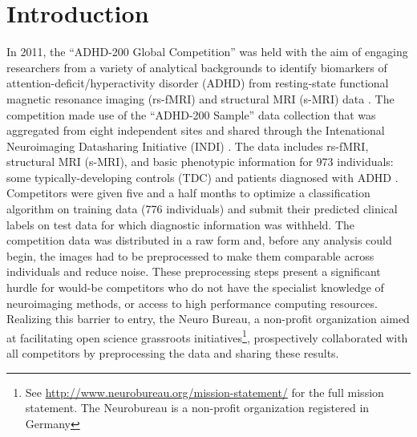 \documentclass[preprint,12pt,3p]{elsarticle}
\begin{document}

\section{Introduction}

In 2011, the ``ADHD-200 Global Competition'' was held with the aim of engaging researchers from a variety of analytical backgrounds to identify biomarkers of attention-deficit/hyperactivity disorder (ADHD) from resting-state functional magnetic resonance imaging (rs-fMRI) and structural MRI (s-MRI) data \cite{Milham2012}. The competition made use of the ``ADHD-200 Sample'' data collection that was aggregated from eight independent sites and shared through the Intenational Neuroimaging Datasharing Initiative (INDI) \cite{Mennes2013}. The data includes rs-fMRI, structural MRI (s-MRI), and basic phenotypic information for 973 individuals: some typically-developing controls (TDC) and patients diagnosed with ADHD \cite{Milham2012}. Competitors were given five and a half months to optimize a classification algorithm on training data (776 individuals) and submit their predicted clinical labels on test data for which diagnostic information was withheld. The competition data was distributed in a raw form and, before any analysis could begin, the images had to be preprocessed to make them comparable across individuals and reduce noise. These preprocessing steps present a significant hurdle for would-be competitors who do not have the specialist knowledge of neuroimaging methods, or access to high performance computing resources. Realizing this barrier to entry, the Neuro Bureau, a non-profit organization aimed at facilitating open science grassroots initiatives\footnote{See \url{http://www.neurobureau.org/mission-statement/} for the full mission statement. The Neurobureau is a non-profit organization registered in Germany}, prospectively collaborated with all competitors by preprocessing the data and sharing these results.
\end{document}
